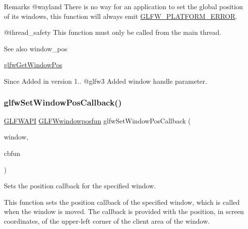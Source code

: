 \begin{DoxyRemark}{Remarks}
@wayland There is no way for an application to set the global position of its windows, this function will always emit \mbox{\hyperlink{group__errors_gad44162d78100ea5e87cdd38426b8c7a1}{G\+L\+F\+W\+\_\+\+P\+L\+A\+T\+F\+O\+R\+M\+\_\+\+E\+R\+R\+OR}}.
\end{DoxyRemark}
@thread\+\_\+safety This function must only be called from the main thread.

\begin{DoxySeeAlso}{See also}
window\+\_\+pos 

\mbox{\hyperlink{group__window_ga0076a8591ef7494d359730cf2250b45b}{glfw\+Get\+Window\+Pos}}
\end{DoxySeeAlso}
\begin{DoxySince}{Since}
Added in version 1.. @glfw3 Added window handle parameter. 
\end{DoxySince}
\mbox{\label{group__window_gaea610899c4cb070dcd655c6de1fe1d2c}} 
\subsubsection{\texorpdfstring{glfwSetWindowPosCallback()}{glfwSetWindowPosCallback()}}
{\footnotesize\ttfamily \mbox{\hyperlink{glfw3_8h_a56da5036b2cc259351ae22fd6439bb47}{G\+L\+F\+W\+A\+PI}} \mbox{\hyperlink{group__window_gafd8db81fdb0e850549dc6bace5ed697a}{G\+L\+F\+Wwindowposfun}} glfw\+Set\+Window\+Pos\+Callback (\begin{DoxyParamCaption}\item[{\mbox{\hyperlink{group__window_ga3c96d80d363e67d13a41b5d1821f3242}{G\+L\+F\+Wwindow}} $\ast$}]{window,  }\item[{\mbox{\hyperlink{group__window_gafd8db81fdb0e850549dc6bace5ed697a}{G\+L\+F\+Wwindowposfun}}}]{cbfun }\end{DoxyParamCaption})}



Sets the position callback for the specified window. 

This function sets the position callback of the specified window, which is called when the window is moved. The callback is provided with the position, in screen coordinates, of the upper-\/left corner of the client area of the window.



